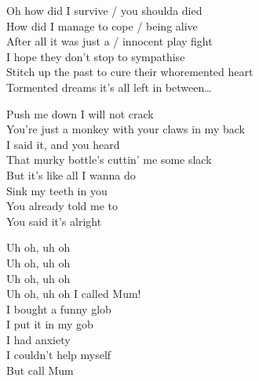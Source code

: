 Oh how did I survive / you shoulda died\\
How did I manage to cope / being alive\\
After all it was just a / innocent play fight\\
I hope they don't stop to sympathise\\

Stitch up the past to cure their whoremented heart\\

Tormented dreams it's all left in between…\\




Push me down I will not crack\\
You're just a monkey with your claws in my back\\
I said it, and you heard\\
That murky bottle's cuttin' me some slack\\

But it's like all I wanna do\\
Sink my teeth in you\\
You already told me to\\
You said it's alright\\




Uh oh, uh oh\\
Uh oh, uh oh\\
Uh oh, uh oh\\
Uh oh, uh oh I called Mum!\\

I bought a funny glob\\
I put it in my gob\\
I had anxiety\\
I couldn't help myself\\
But call Mum\\





